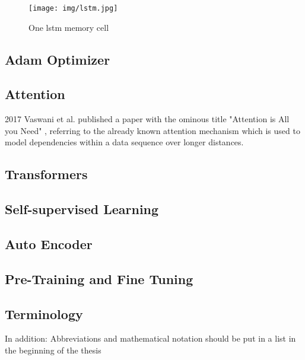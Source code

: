 \begin{figure}[h]
	\centering
	\texttt{[image: img/lstm.jpg]}
	\caption{One \gls{lstm} memory cell \cite{rnn_zachary}}
	\label{fig:background:lstm}
\end{figure}

\subsection{Adam Optimizer}

\subsection{Attention}

2017 Vaswani et al. published a paper with the ominous title "Attention is All you Need" \cite{attention_origin}, referring to the already known attention mechanism which is used to model dependencies within a data sequence over longer distances.

\subsection{Transformers}

\subsection{Self-supervised Learning}

\subsection{Auto Encoder}

\subsection{Pre-Training and Fine Tuning}

\subsection{Terminology} \label{subsec.terminology}

In addition: Abbreviations and mathematical notation should be put in a list in the beginning of the thesis 

\newpage